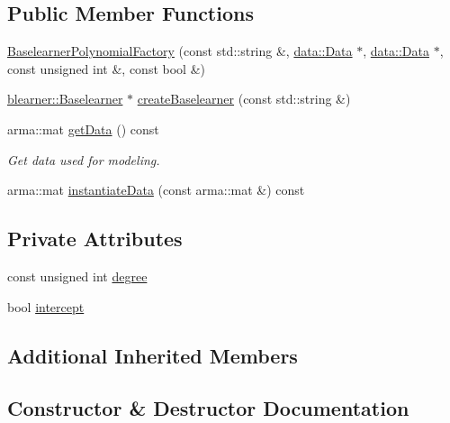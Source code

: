 \subsection*{Public Member Functions}
\begin{DoxyCompactItemize}
\item 
\hyperlink{classblearnerfactory_1_1_baselearner_polynomial_factory_aaa0dbb3dab4a98dfb1835998fc3ffa50}{Baselearner\+Polynomial\+Factory} (const std\+::string \&, \hyperlink{classdata_1_1_data}{data\+::\+Data} $\ast$, \hyperlink{classdata_1_1_data}{data\+::\+Data} $\ast$, const unsigned int \&, const bool \&)
\item 
\hyperlink{classblearner_1_1_baselearner}{blearner\+::\+Baselearner} $\ast$ \hyperlink{classblearnerfactory_1_1_baselearner_polynomial_factory_a18095806fa93e6ac2159e966ededc1cf}{create\+Baselearner} (const std\+::string \&)
\item 
arma\+::mat \hyperlink{classblearnerfactory_1_1_baselearner_polynomial_factory_af6d997c89f2e81a490352f23dee1ef9d}{get\+Data} () const
\begin{DoxyCompactList}\small\item\em Get data used for modeling. \end{DoxyCompactList}\item 
arma\+::mat \hyperlink{classblearnerfactory_1_1_baselearner_polynomial_factory_a3b84557f192ac156032ca4ad22fd341b}{instantiate\+Data} (const arma\+::mat \&) const
\end{DoxyCompactItemize}
\subsection*{Private Attributes}
\begin{DoxyCompactItemize}
\item 
const unsigned int \hyperlink{classblearnerfactory_1_1_baselearner_polynomial_factory_a09e03424857dc2d345af9ac98173b74c}{degree}
\item 
bool \hyperlink{classblearnerfactory_1_1_baselearner_polynomial_factory_acb53ec3a5ea73dac4cb157ea1cf641d2}{intercept}
\end{DoxyCompactItemize}
\subsection*{Additional Inherited Members}


\subsection{Constructor \& Destructor Documentation}
\mbox{\label{classblearnerfactory_1_1_baselearner_polynomial_factory_aaa0dbb3dab4a98dfb1835998fc3ffa50}} 
